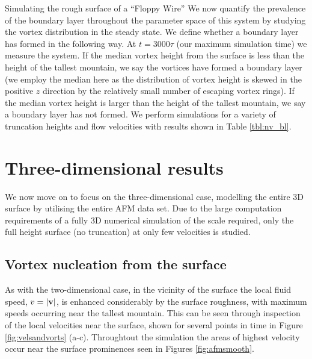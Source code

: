 \begin{chapter}{\label{cha:afm}Simulating the rough surface of a ``Floppy Wire''}
We now quantify the prevalence of the boundary layer throughout the parameter space of this system by studying the vortex distribution in the steady state. We define whether a boundary layer has formed in the following way. At $t=3000\tau$ (our maximum simulation time) we measure the system. If the median vortex height from the surface is less than the height of the tallest mountain, we say the vortices have formed a boundary layer (we employ the median here as the distribution of vortex height is skewed in the positive $z$ direction by the relatively small number of escaping vortex rings). If the median vortex height is larger than the height of the tallest mountain, we say a boundary layer has not formed. We perform simulations for a variety of truncation heights and flow velocities with results shown in Table \ref{tbl:nv_bl}.


 
\section{Three-dimensional results}
We now move on to focus on the three-dimensional case, modelling the entire 3D surface by utilising the entire AFM data set. Due to the large computation requirements of a fully 3D numerical simulation of the scale required, only the full height surface (no truncation) at only few velocities is studied.

\subsection{Vortex nucleation from the surface}
As with the two-dimensional case, in the vicinity of the surface the local fluid speed, $v=|{\bf v}|$, is enhanced considerably by the surface roughness, with maximum speeds occurring near the tallest mountain. This can be seen through inspection of the local velocities near the surface, shown for several points in time in Figure \ref{fig:velsandvorts} (a-c). Throughtout the simulation the areas of highest velocity occur near the surface prominences seen in Figures \ref{fig:afmsmooth}.


\end{chapter}
